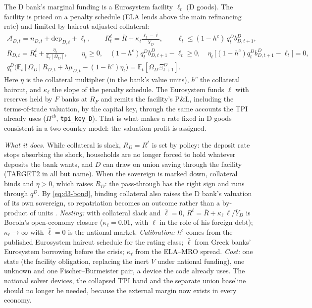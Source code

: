 \documentclass[11pt]{article}
\newcommand{\E}{\mathbb{E}}
\newcommand{\A}{\mathcal{A}}
\newcommand{\code}[1]{\texttt{\small #1}}
\begin{document}
The D bank's marginal funding is a Eurosystem facility $\ell_t$ (D goods). The facility is
priced on a penalty schedule (ELA lends above the main refinancing rate) and limited by
haircut-adjusted collateral:
\begin{gather}
\A_{D,t}=n_{D,t}+\mathrm{dep}_{D,t}+\ell_t,\qquad
R^\ell_t=\bar R+\kappa_\ell\frac{\ell_t-\bar\ell}{\bar Y_D},\qquad
\ell_t\le(1-h^c)\,q^D_tb^D_{D,t+1},\\
R_{D,t}=R^\ell_t+\frac{\eta_t}{\E_t[\Omega_D]},\qquad
\eta_t\ge0,\quad (1-h^c)q^D_tb^D_{D,t+1}-\ell_t\ge0,\quad \eta_t\,\bigl[(1-h^c)q^D_tb^D_{D,t+1}-\ell_t\bigr]=0,
\label{eq:d3}\\
q^D_t\bigl(\E_t[\Omega_D]R_{D,t}+\lambda\mu_{D,t}-(1-h^c)\eta_t\bigr)=\E_t[\Omega_D\Xi^D_{t+1}].
\label{eq:d3-bond}
\end{gather}
Here $\eta$ is the collateral multiplier (in the bank's value units), $h^c$ the collateral
haircut, and $\kappa_\ell$ the slope of the penalty schedule. The Eurosystem funds $\ell$ with
reserves held by $F$ banks at $R_F$ and remits the facility's P\&L, including the
terms-of-trade valuation, by the capital key, through the same accounts the TPI already uses
($\Pi^{cb}$, \code{tpi\_key\_D}). That is what makes a rate fixed in D goods consistent in a
two-country model: the valuation profit is assigned.

\emph{What it does.} While collateral is slack, $R_D=R^\ell$ is set by policy: the deposit rate
stops absorbing the shock, households are no longer forced to hold whatever deposits the bank
wants, and $D$ can draw on union saving through the facility (TARGET2 in all but name). When the
sovereign is marked down, collateral binds and $\eta>0$, which raises $R_D$: the pass-through has
the right sign and runs through $q^D$. By \eqref{eq:d3-bond}, binding collateral also raises the
D bank's valuation of its own sovereign, so repatriation becomes an outcome rather than a
by-product of units \citep{crosignani2020unintended,drechsler2016who}.
\emph{Nesting:} with collateral slack and $\bar\ell=0$, $R^\ell=\bar R+\kappa_\ell\,\ell/\bar Y_D$
is Bocola's open-economy closure ($\kappa_\ell=0.01$, with $\ell$ in the role of his foreign
debt); $\kappa_\ell\to\infty$ with $\bar\ell=0$ is the national market.
\emph{Calibration:} $h^c$ comes from the published Eurosystem haircut schedule for the rating
class; $\bar\ell$ from Greek banks' Eurosystem borrowing before the crisis; $\kappa_\ell$ from the
ELA--MRO spread.
\emph{Cost:} one state (the facility obligation, replacing the inert $V$ under national funding),
one unknown and one Fischer--Burmeister pair, a device the code already uses. The national
solver devices, the collapsed TPI band and the separate union baseline should no longer be
needed, because the external margin now exists in every economy.
\end{document}

